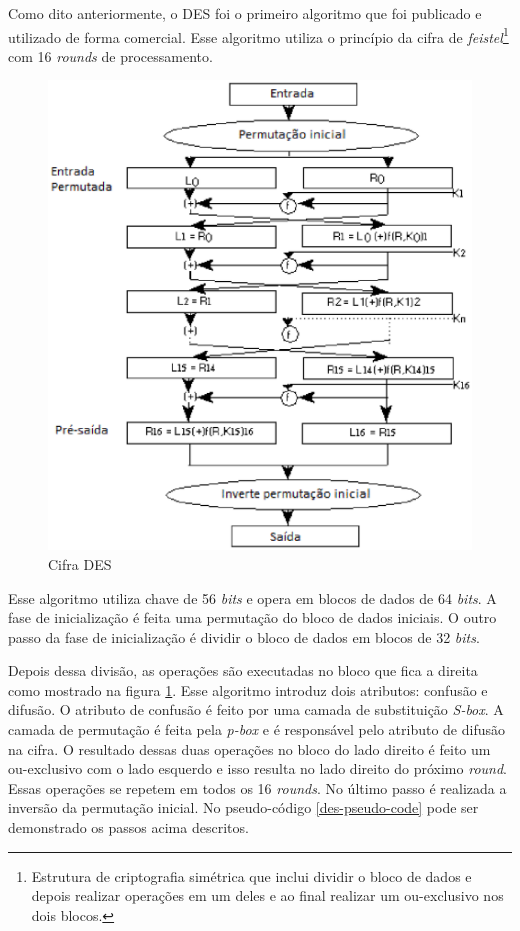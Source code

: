 Como dito anteriormente, o DES foi o primeiro algoritmo que foi publicado e utilizado de forma comercial. Esse algoritmo utiliza o princípio da cifra de \textit{feistel}\footnote{Estrutura de criptografia simétrica que inclui dividir o bloco de dados e depois realizar operações em um deles e ao final realizar um ou-exclusivo nos dois blocos.} com 16 \textit{rounds} de processamento.

\begin{figure}[h]
	\centering
	\includegraphics[scale=0.8]
		{figuras/des_cipher.eps}
		\caption[Cifra \textit{DES}]{Cifra DES\protect\footnotemark} 
		\label{cifra-des}
\end{figure}

Esse algoritmo utiliza chave de 56 \textit{bits} e opera em blocos de dados de 64 \textit{bits}. A fase de inicialização é feita uma permutação do bloco de dados iniciais. O outro passo da fase de inicialização é dividir o bloco de dados em blocos de 32 \textit{bits}. 

Depois dessa divisão, as operações são executadas no bloco que fica a direita como mostrado na figura \ref{cifra-des}. Esse algoritmo introduz dois atributos: confusão e difusão. O atributo de confusão é feito por uma camada de substituição \textit{S-box}. A camada de permutação é feita pela \textit{p-box} e é responsável pelo atributo de difusão na cifra. O resultado dessas duas operações no bloco do lado direito é feito um ou-exclusivo com o lado esquerdo e isso resulta no lado direito do próximo \textit{round}. Essas operações se repetem em todos os 16 \textit{rounds}. No último passo é realizada a inversão da permutação inicial. No pseudo-código \ref{des-pseudo-code} pode ser demonstrado os passos acima descritos.

